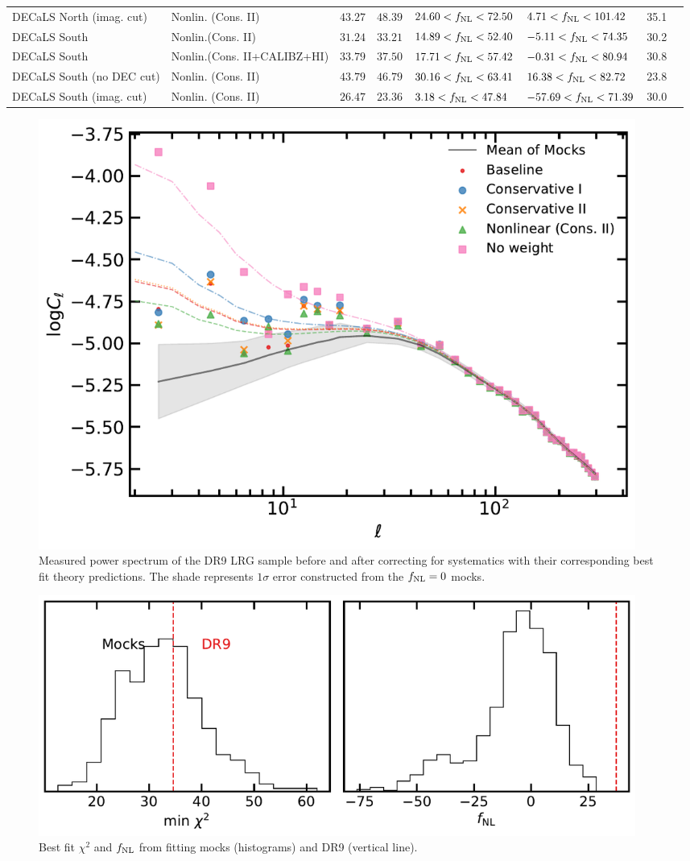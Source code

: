 \begin{table}
{\begin{tabular}{llllllll}
DECaLS North (imag. cut)  & Nonlin. (Cons. II)& $ 43.27$& $ 48.39$& $ 24.60<f_{\rm NL}< 72.50$& $  4.71<f_{\rm NL}<101.42$ &   35.1\\
DECaLS South              & Nonlin.(Cons. II)& $ 31.24$& $ 33.21$& $ 14.89<f_{\rm NL}< 52.40$& $ -5.11<f_{\rm NL}< 74.35$ &   30.2\\
DECaLS South              & Nonlin.(Cons. II+CALIBZ+HI)& $ 33.79$& $ 37.50$& $ 17.71<f_{\rm NL}< 57.42$& $ -0.31<f_{\rm NL}< 80.94$ &   30.8\\
DECaLS South (no DEC cut) & Nonlin. (Cons. II)& $ 43.79$& $ 46.79$& $ 30.16<f_{\rm NL}< 63.41$& $ 16.38<f_{\rm NL}< 82.72$ &   23.8\\
DECaLS South (imag. cut)  & Nonlin. (Cons. II)& $ 26.47$& $ 23.36$& $  3.18<f_{\rm NL}< 47.84$& $-57.69<f_{\rm NL}< 71.39$ &   30.0\\
\hline
    \end{tabular}
}
\end{table}


\begin{figure}
    \centering
    \includegraphics[width=0.95\textwidth]{figures/model_dr9.pdf} 
    \caption{Measured power spectrum of the DR9 LRG sample before and after correcting for systematics with their corresponding best fit theory predictions. The shade represents $1\sigma$ error constructed from the $f_{\rm NL}=0$ mocks.}
    \label{fig:cl_dr9}
\end{figure}

\begin{figure}
\centering
    \includegraphics[width=0.95\textwidth]{figures/pdf_dr9vsmocks.pdf} 
    \caption{Best fit $\chi^{2}$ and $f_{\rm NL}$ from fitting mocks (histograms) and DR9 (vertical line).}\label{fig:dr9vsmocks}
\end{figure}

